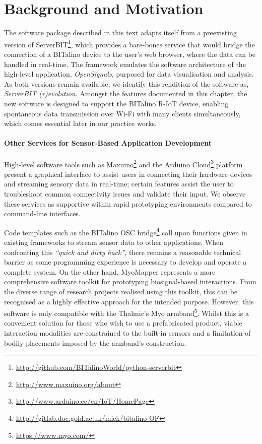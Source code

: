 \section{Background and Motivation}

The software package described in this text adapts itself from a preexisting version of ServerBIT\footnote{\url{http://github.com/BITalinoWorld/python-serverbit}}, which provides a bare-bones service that would bridge the connection of a BITalino device to the user’s web browser, where the data can be handled in real-time. The framework emulates the software architecture of the high-level application, \textit{OpenSignals}, purposed for data visualisation and analysis. As both versions remain available, we identify this rendition of the software as, \textit{ServerBIT (r)evolution}. Amongst the features documented in this chapter, the new software is designed to support the BITalino R-IoT device, enabling spontaneous data transmission over Wi-Fi with many clients simultaneously, which comes essential later in our practice works.

\paragraph{Other Services for Sensor-Based Application Development} \label{services}
High-level software tools such as Maxuino\footnote[2]{\url{http://www.maxuino.org/about}} and the Arduino Cloud\footnote[3]{\url{http://www.arduino.cc/en/IoT/HomePage}} platform present a graphical interface to assist users in connecting their hardware devices and streaming sensory data in real-time; certain features assist the user to troubleshoot common connectivity issues and validate their input. We observe these services as supportive within rapid prototyping environments compared to command-line interfaces.

Code templates such as the BITalino OSC bridge\footnote[4]{\url{http://gitlab.doc.gold.ac.uk/mick/bitalino-OF}} call upon functions given in existing frameworks to stream sensor data to other applications. When confronting this \textit{``quick and dirty hack''}, there remains a reasonable technical barrier as some programming experience is necessary to develop and operate a complete system. On the other hand, MyoMapper\cite{donato_myo_nodate}  represents a more comprehensive software toolkit for prototyping biosignal-based interactions. From the diverse range of research projects realised using this toolkit\cite{brown_simple_2018,bullock_approaches_2016,di_donato_accessible_2019}, this can be recognised as a highly effective approach for the intended purpose. However, this software is only compatible with the Thalmic's Myo armband\footnote{\url{https://www.myo.com/}}. Whilst this is a convenient solution for those who wish to use a prefabricated product, viable interaction modalities are constrained to the built-in sensors and a limitation of bodily placements imposed by the armband's construction.

